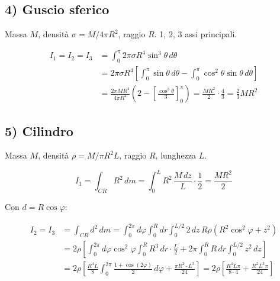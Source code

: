 
\subsection{4) Guscio sferico}

Massa $M$, densità $\sigma = M/4\pi R^2$, raggio $R$. 1, 2, 3 assi principali.


\begin{align*}
\boxed{I_1 = I_2 = I_3} &= \int_0^{\pi} 2\pi\sigma R^4 \sin^3\theta\,d\theta \\
&= 2\pi\sigma R^4 \left[\int_0^{\pi}\sin\theta\,d\theta - \int_0^{\pi}\cos^2\theta\sin\theta\,d\theta\right] \\
&= \frac{2\pi M R^4}{4\pi R^2}\left(2 - \left[\frac{\cos^3\theta}{3}\right]_0^{\pi}\right) = \frac{MR^2}{2}\cdot\frac{4}{3} = \boxed{\frac{2}{3}MR^2}
\end{align*}

\subsection{5) Cilindro}

Massa $M$, densità $\rho = M/\pi R^2 L$, raggio $R$, lunghezza $L$.


\begin{equation}
\boxed{I_1} = \int_{CR} R^2\,dm = \int_0^{L} R^2\,\frac{M\,dz}{L}\cdot\frac{1}{2} = \boxed{\frac{MR^2}{2}}
\end{equation}

Con $d = R\cos\varphi$:

\begin{align*}
\boxed{I_2 = I_3} &= \int_{CR} d^2\,dm = \int_0^{2\pi}d\varphi\int_0^{R}dr\int_0^{L/2} 2\,dz\,R\rho(R^2\cos^2\varphi + z^2) \\
&= 2\rho\left[\int_0^{2\pi}d\varphi\cos^2\varphi \int_0^{R} R^3\,dr\cdot\frac{L}{2} + 2\pi\int_0^R R\,dr\int_0^{L/2} z^2\,dz\right] \\
&= 2\rho\left[\frac{R^4L}{8}\int_0^{2\pi}\frac{1+\cos(2\varphi)}{2}\,d\varphi + \frac{\pi R^2 \cdot L^3}{24}\right] = 2\rho\left[\frac{R^4 L\pi}{8\cdot 4} + \frac{R^2 L^3\pi}{24}\right]
\end{align*}

